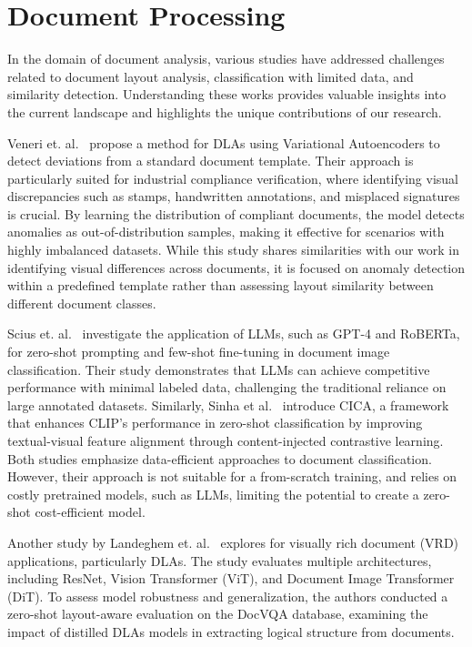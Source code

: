 \section{Document Processing}

In the domain of document analysis, various studies have addressed challenges related to document layout analysis, classification with limited data, and similarity detection. Understanding these works provides valuable insights into the current landscape and highlights the unique contributions of our research.

Veneri et. al.~\cite{veneri2022document} propose a method for \glspl{DLA} using Variational Autoencoders to detect deviations from a standard document template. Their approach is particularly suited for industrial compliance verification, where identifying visual discrepancies such as stamps, handwritten annotations, and misplaced signatures is crucial. By learning the distribution of compliant documents, the model detects anomalies as out-of-distribution samples, making it effective for scenarios with highly imbalanced datasets. While this study shares similarities with our work in identifying visual differences across documents, it is focused on anomaly detection within a predefined template rather than assessing layout similarity between different document classes.%

Scius et. al.~\cite{scius2024zeroshot} investigate the application of \glspl{LLM}, such as GPT-4 and RoBERTa, for zero-shot prompting and few-shot fine-tuning in document image classification. Their study demonstrates that \glspl{LLM} can achieve competitive performance with minimal labeled data, challenging the traditional reliance on large annotated datasets. Similarly, Sinha et al.~\cite{sinha2024cica} introduce CICA, a framework that enhances CLIP's performance in zero-shot classification by improving textual-visual feature alignment through content-injected contrastive learning. Both studies emphasize data-efficient approaches to document classification. However, their approach is not suitable for a from-scratch training, and relies on costly pretrained models, such as LLMs, limiting the potential to create a zero-shot cost-efficient model.

Another study by Landeghem et. al.~\cite{van2024distildoc} explores for visually rich document (VRD) applications, particularly \glspl{DLA}. The study evaluates multiple architectures, including ResNet, Vision Transformer (ViT), and Document Image Transformer (DiT). To assess model robustness and generalization, the authors conducted a zero-shot layout-aware evaluation on the DocVQA database, examining the impact of distilled \glspl{DLA} models in extracting logical structure from documents.

